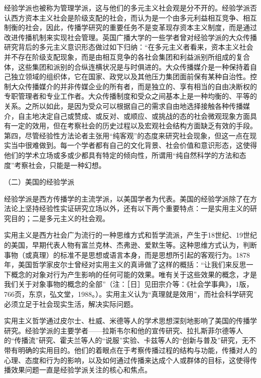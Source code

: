 \documentclass[UTF8,12pt]{ctexart}
\numberwithin{equation}{section} %
\numberwithin{figure}{section}
\numberwithin{table}{section}
\begin{document}
	经验学派也被称为管理学派，这与他们的多元主义社会观是分不开的。经验学派否认西方资本主义社会是阶级支配的社会，而认为是一个由多元利益相互竞争、相互制衡的社会，因此，传播学研究的重要任务不是变革现存资本主义制度，而是通过改进传播机制来实现社会管理。英国广播大学的一些学者曾对经验学派的大众传播研究背后的多元主义意识形态做过如下归纳：“在多元主义者看来，资本主义社会并不存在阶级支配现象，而是由相互竞争的各社会集团和利益派别所组成的复合体，这些集团和派别的合纵连横状况是与时俱进的。大众传播媒介是一种保持着自己独立领域的组织体，它在国家、政党以及其他压力集团面前保有某种自治性。控制大众传播媒介的并非传媒企业的所有者，而是独立的、享有相当的自由决断权的专职管理者和专业工作者。大众传播制度和受众之间基本上是一种均衡的、平等的关系。之所以如此，是因为受众可以根据自己的需求自由地选择接触各种传播媒介，自主地决定自己或赞成、或反对、或顺应、或挑战的态的社会微观现象方面具有一定的效用，但在考察社会的历史过程以及宏观社会结构方面缺乏有效的手段。第四，尽管经验性方法论者主张用“纯客观”的态度来研究社会现象，但这一点在现实当中很难做到。每一个学者都有自己的文化背景、社会价值和意识形态，这使得他们的学术立场或多或少都具有特定的倾向性，所谓用“纯自然科学的方法和态度”考察社会，只能是一种幻想。
	
	（二）美国的经验学派
	
	经验学派是西方传播学的主流学派，以美国学者为代表。美国的经验学派除了在方法论上坚持经验性实证研究立场以外，还有以下两个重要特点：一是实用主义的研究目的；二是多元主义的社会观。
	
	实用主义是西方社会广为流行的一种思维方式和哲学流派，产生于18世纪、19世纪的美国，早期代表人物有富兰克林、杰弗逊、爱默生等。这种思维方式认为，判断事物（或真理）的标准不是思想或语言本身，而是思想所引起的客观行为。1878年，美国哲学家皮尔士曾经对实用主义的真谛做了这样的概括：“让我们来反思一下概念的对象对行为产生影响的任何可能的效果。唯有关于这些效果的概念，才是我们关于对象事物的概念的全部”（注：［日］见田宗介等：《社会学事典》，1版，766页，东京，弘文堂，1988。）。实用主义认为“真理就是效用”，而社会科学研究必须立足于社会现实生活，解决实际问题。
	
	实用主义哲学通过皮尔士、杜威、米德等人的学术思想深刻地影响了美国的传播学研究。经验学派的主要学者——拉斯韦尔和他的宣传研究、拉扎斯菲尔德等人的“传播流”研究、霍夫兰等人的“说服”实验、卡兹等人的“创新与普及”研究，无不带有明确的实用目的。他们的着眼点在于考察传播过程的结构与功能，传播对人的心理、态度和行为的影响，以及如何通过传播来达成个人或群体的目标，这使得传播效果问题一直是经验学派关注的核心和焦点。
	
\end{document}
